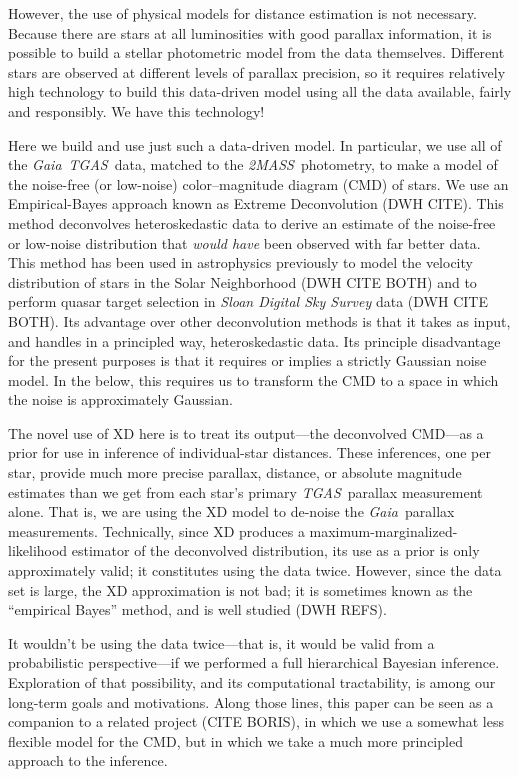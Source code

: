 \documentclass[12pt, preprint]{aastex6}
\newcommand{\acronym}[1]{{\small{#1}}}
\newcommand{\project}[1]{\textsl{#1}}
\newcommand{\tgas}{\project{\acronym{TGAS}}}
\newcommand{\tmass}{\project{\acronym{2MASS}}}
\newcommand{\gaia}{\project{Gaia}}
\begin{document}
However, the use of physical models for distance estimation is not necessary.
Because there are stars at all luminosities with good parallax information,
it is possible to build a stellar photometric model from the data themselves.
Different stars are observed at different levels of parallax precision,
so it requires relatively high technology to build this data-driven model
using all the data available, fairly and responsibly.
We have this technology!

Here we build and use just such a data-driven model.
In particular, we use all of the \gaia\ \tgas\ data, matched to the \tmass\
photometry, to make a model of the noise-free (or low-noise)
color--magnitude diagram (CMD) of stars.
We use
an Empirical-Bayes approach known as Extreme Deconvolution (DWH CITE).
This method deconvolves heteroskedastic data to derive an estimate
of the noise-free or low-noise distribution that \emph{would have}
been observed with far better data.
This method has been used in astrophysics
previously to model the velocity distribution of stars in the Solar
Neighborhood (DWH CITE BOTH) and to perform quasar target selection
in \project{Sloan Digital Sky Survey} data (DWH CITE BOTH).
Its advantage over other deconvolution methods is that it takes as input,
and handles in a principled way, heteroskedastic data.
Its principle disadvantage for the present purposes is that it requires
or implies a strictly Gaussian noise model.
In the below, this requires us to transform the CMD to a space in which
the noise is approximately Gaussian.

The novel use of XD here is to treat its output---the deconvolved CMD---as
a prior for use in inference of individual-star distances.
These inferences, one per star, provide much more precise parallax, distance,
or absolute magnitude estimates than we get from each star's primary
\tgas\ parallax measurement alone.
That is, we are using the XD model to de-noise the \gaia\ parallax
measurements.
Technically, since XD produces a maximum-marginalized-likelihood estimator
of the deconvolved distribution,
its use as a prior is only approximately valid; it constitutes using the
data twice.
However, since the data set is large, the XD approximation is not bad; it is
sometimes known as the ``empirical Bayes'' method, and is well studied (DWH REFS).

It wouldn't be using the data twice---that is, it would be valid from a
probabilistic perspective---if we performed a full hierarchical Bayesian
inference.
Exploration of that possibility, and its computational tractability,
is among our long-term goals and motivations.
Along those lines, this paper can be seen as a companion to
a related project (CITE BORIS), in which we use a
somewhat less flexible model for the CMD, but in which we take a much more principled
approach to the inference.
\end{document}

